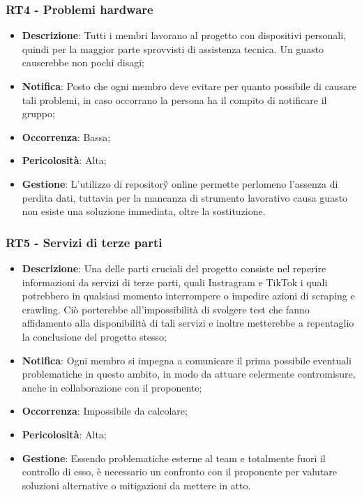 	\subsubsection*{RT4 - Problemi hardware}
	\begin{itemize}
		\item \textbf{Descrizione}: Tutti i membri lavorano al progetto con dispositivi personali, quindi per la maggior parte sprovvisti di assistenza tecnica. Un guasto causerebbe non pochi disagi;
		\item \textbf{Notifica}: Posto che ogni membro deve evitare per quanto possibile di causare tali problemi, in caso occorrano la persona ha il compito di notificare il gruppo;
		\item \textbf{Occorrenza}: Bassa;
		\item \textbf{Pericolosità}: Alta;
		\item \textbf{Gestione}: L'utilizzo di repository\G{} online permette perlomeno l'assenza di perdita dati, tuttavia per la mancanza di strumento lavorativo causa guasto non esiste una soluzione immediata, oltre la sostituzione.
	\end{itemize}

	\subsubsection*{RT5 - Servizi di terze parti}
	\begin{itemize}
		\item \textbf{Descrizione}: Una delle parti cruciali del progetto consiste nel reperire informazioni da servizi di terze parti, quali Instragram e TikTok i quali potrebbero in qualsiasi momento interrompere o impedire azioni di scraping e crawling. Ciò porterebbe all'impossibilità di svolgere test che fanno affidamento alla disponibilità di tali servizi e inoltre metterebbe a repentaglio la conclusione del progetto stesso;
		\item \textbf{Notifica}: Ogni membro si impegna a comunicare il prima possibile eventuali problematiche in questo ambito, in modo da attuare celermente contromisure, anche in collaborazione con il proponente;
		\item \textbf{Occorrenza}: Impossibile da calcolare;
		\item \textbf{Pericolosità}: Alta;
		\item \textbf{Gestione}: Essendo problematiche esterne al team e totalmente fuori il controllo di esso, è necessario un confronto con il proponente per valutare soluzioni alternative o mitigazioni da mettere in atto.
	\end{itemize}

